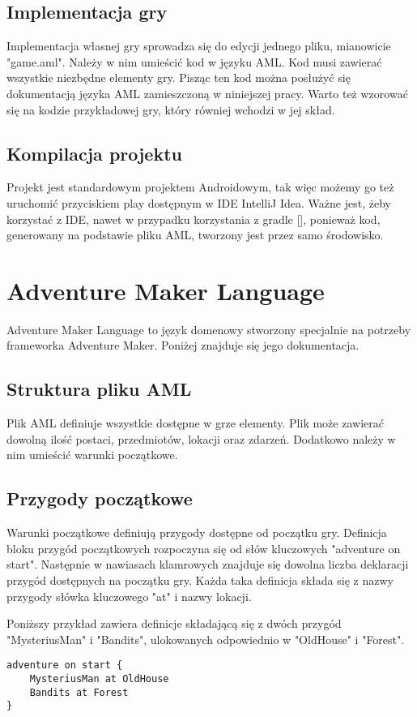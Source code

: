 \documentclass	{xmgr}
\begin{document}
\section{Implementacja gry}
Implementacja własnej gry sprowadza się do edycji jednego pliku, mianowicie "game.aml". Należy w nim umieścić kod w języku AML. Kod musi  zawierać wszystkie niezbędne elementy gry. Pisząc ten kod można posłużyć się dokumentacją języka AML zamieszczoną w niniejszej pracy. Warto też wzorować się na kodzie przykładowej gry, który równiej wchodzi w jej skład.

\section{Kompilacja projektu}
Projekt jest standardowym projektem Androidowym, tak więc możemy go też uruchomić przyciskiem play dostępnym w IDE IntelliJ Idea. Ważne jest, żeby korzystać z IDE, nawet w przypadku korzystania z gradle [], ponieważ kod, generowany na podstawie pliku AML, tworzony jest przez samo środowisko.

\chapter{Adventure Maker Language} 
Adventure Maker Language to język domenowy stworzony specjalnie na potrzeby frameworka Adventure Maker. Poniżej znajduje się jego dokumentacja.

\section{Struktura pliku AML} 
Plik AML definiuje wszystkie dostępne w grze elementy. Plik może zawierać dowolną ilość postaci, przedmiotów, lokacji oraz zdarzeń. Dodatkowo należy w nim umieścić warunki początkowe. 

\section{Przygody początkowe} 
Warunki początkowe definiują przygody dostępne od początku gry. Definicja bloku przygód początkowych rozpoczyna się od słów kluczowych
"adventure on start". Następnie w nawiasach klamrowych znajduje się dowolna liczba deklaracji przygód dostępnych na początku gry.
Każda taka definicja składa się z nazwy przygody słówka kluczowego "at" i nazwy lokacji.

Poniższy przykład zawiera definicje składającą się z dwóch przygód "MysteriusMan" i "Bandits", ulokowanych odpowiednio w "OldHouse" i "Forest".
\begin{lstlisting}
adventure on start {
	MysteriusMan at OldHouse
	Bandits at Forest
}
\end{lstlisting}
\end{document}
